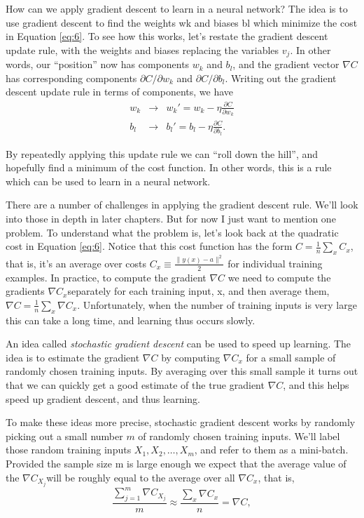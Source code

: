 \documentclass[a4paper,twoside,10pt]{book}
\begin{document}
How can we apply gradient descent to learn in a neural network? The idea is to use gradient descent to find the weights wk and biases bl which minimize the cost in Equation \ref{eq:6}. To see how this works, let's restate the gradient descent update rule, with the weights and biases replacing the variables $v_j$. In other words, our ``position'' now has components $w_k$ and $b_l$, and the gradient vector $\nabla C$ has corresponding components $\partial C/\partial w_k$ and $\partial C / \partial b_l$. Writing out the gradient descent update rule in terms of components, we have
\begin{eqnarray}
w_k & \to & w_k' = w_k-\eta \frac{\partial C}{\partial w_k}\\
b_l & \to & b_l' = b_l-\eta \frac{\partial C}{\partial b_l}.
\end{eqnarray}


By repeatedly applying this update rule we can ``roll down the hill'', and hopefully find a minimum of the cost function. In other words, this is a rule which can be used to learn in a neural network.

There are a number of challenges in applying the gradient descent rule. We'll look into those in depth in later chapters. But for now I just want to mention one problem. To understand what the problem is, let's look back at the quadratic cost in Equation \ref{eq:6}. Notice that this cost function has the form $C = \frac{1}{n} \sum_x C_x$, that is, it's an average over costs $C_x \equiv \frac{\|y(x)-a\|^2}{2}$ for individual training examples. In practice, to compute the gradient $\nabla C$ we need to  compute the gradients $\nabla C_x$separately for each training input, x, and then average them, $\nabla C = \frac{1}{n}\sum_x \nabla C_x$. Unfortunately, when the number of training inputs is very large this can take a long time, and learning thus occurs slowly.

An idea called \textit{stochastic gradient descent} can be used to speed up learning. The idea is to estimate the gradient $\nabla C$ by computing $\nabla C_x$ for a small sample of randomly chosen training inputs. By averaging over this small sample it turns out that we can quickly get a good estimate of the true gradient $\nabla C$, and this helps speed up gradient descent, and thus learning.

To make these ideas more precise, stochastic gradient descent works by randomly picking out a small number $m$ of randomly chosen training inputs. We'll label those random training inputs $X_1,X_2,\ldots,X_m$, and refer to them as a mini-batch. Provided the sample size m is large enough we expect that the average value of the $\nabla C_{X_j}$will be roughly equal to the average over all $\nabla C_x$, that is,
\begin{equation}
	\frac{\sum_{j=1}^m \nabla C_{X_{j}}}{m} \approx \frac{\sum_x \nabla C_x}{n} = \nabla C,
	\label{eq:18}
\end{equation}
\end{document}
